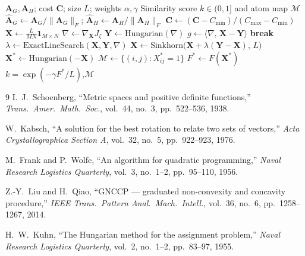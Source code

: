 \documentclass[conference]{IEEEtran}
\begin{document}
{\small
\begin{algorithm}[H]
\caption{WCS-GNCCP with Frank-Wolfe}
\label{alg:gnccp-fw}
\begin{algorithmic}[1]
\REQUIRE $\mathbf{A}_G,\mathbf{A}_H$; cost $\mathbf{C}$;
  size $L$; weights $\alpha,\gamma$
\ENSURE Similarity score $k \!\in\! (0, 1]$
  and atom map $\mathcal{M}$
\STATE $\hat{\mathbf{A}}_G \leftarrow
  \mathbf{A}_G / \|\mathbf{A}_G\|_F$;\;
  $\hat{\mathbf{A}}_H \leftarrow
  \mathbf{A}_H / \|\mathbf{A}_H\|_F$
  \hfill{}
\STATE $\hat{\mathbf{C}} \leftarrow
  (\mathbf{C}\!-\!C_{\min})/(C_{\max}\!-\!C_{\min})$
\STATE $\mathbf{X} \leftarrow
  \frac{L}{MN}\mathbf{1}_{M\times N}$
  \hfill{}
    \STATE $\nabla \leftarrow
      \nabla_{\!\mathbf{X}} J_\zeta$
      \hfill{}
    \STATE $\mathbf{Y} \leftarrow
      \text{Hungarian}(\nabla)$
      \hfill{}
    \STATE $g \leftarrow
      \langle \nabla,\,\mathbf{X}\!-\!\mathbf{Y}\rangle$
      \hfill{}
      \STATE \textbf{break}
    \ENDIF
    \STATE $\lambda \leftarrow
      \text{ExactLineSearch}(\mathbf{X}, \mathbf{Y}, \nabla)$
      \hfill{}
    \STATE $\mathbf{X} \leftarrow
      \text{Sinkhorn}\!\bigl(
        \mathbf{X}\!+\!\lambda(\mathbf{Y}\!-\!\mathbf{X}),\,L
      \bigr)$
      \hfill{}
  \ENDFOR
\ENDFOR
\STATE $\mathbf{X}^{\!*} \leftarrow
  \text{Hungarian}(-\mathbf{X})$
  \hfill{}
\STATE $\mathcal{M} \leftarrow
  \{(i,j) : X^*_{ij} = 1\}$
  \hfill{}
\STATE $F^{\!*} \leftarrow
  F(\mathbf{X}^{\!*})$
  \hfill{}
\RETURN $k = \exp(-\gamma F^{\!*}/L)$,\;$\mathcal{M}$
  \hfill{}
\end{algorithmic}
\end{algorithm}
}


\begin{thebibliography}{9}
I.~J.~Schoenberg,
``Metric spaces and positive definite functions,''
\textit{Trans.\ Amer.\ Math.\ Soc.},
vol.~44, no.~3, pp.~522--536, 1938.

W.~Kabsch,
``A solution for the best rotation to relate two sets of vectors,''
\textit{Acta Crystallographica Section A},
vol.~32, no.~5, pp.~922--923, 1976.

M.~Frank and P.~Wolfe,
``An algorithm for quadratic programming,''
\textit{Naval Research Logistics Quarterly},
vol.~3, no.~1--2, pp.~95--110, 1956.

Z.-Y.~Liu and H.~Qiao,
``GNCCP --- graduated non-convexity and concavity procedure,''
\textit{IEEE Trans.\ Pattern Anal.\ Mach.\ Intell.},
vol.~36, no.~6, pp.~1258--1267, 2014.

H.~W.~Kuhn,
``The Hungarian method for the assignment problem,''
\textit{Naval Research Logistics Quarterly},
vol.~2, no.~1--2, pp.~83--97, 1955.
\end{thebibliography}
\end{document}
